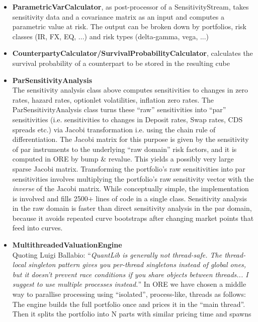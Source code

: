 \documentclass[12pt, a4paper]{report}
\begin{document}
\begin{itemize}
\begin{itemize}
\item writes stress test report to a file
\end{itemize}
\item {\bf ParametricVarCalculator}, as post-processor of a SensitivityStream, takes sensitivity data
  and a covariance matrix as an input and computes a parametric value at risk. The output can be
  broken down by portfolios, risk classes (IR, FX, EQ, ...) and risk types (delta-gamma, vega, ...)
\item {\bf CounterpartyCalculator/SurvivalProbabilityCalculator}, calculates the survival probability
  of a counterpart to be stored in the resulting cube
\item {\bf ParSensitivityAnalysis} \\ 
  The sensitivity analysis class above computes sensitivities to changes in zero rates, hazard rates,
  optionlet volatilities, inflation zero rates. The ParSensitivityAnalysis class turns these ``raw''
  sensitivities into ``par'' sensitivities (i.e. sensitivities to changes in Deposit rates, Swap
  rates, CDS spreads etc.) via Jacobi transformation i.e. using the chain rule of differentiation.
  The Jacobi matrix for this purpose is given by the sensitivity of par instruments to the underlying
  ``raw domain'' risk factors, and it is computed in ORE by bump \& revalue.
  This yields a possibly very large sparse Jacobi matrix. Transforming the portfolio's
  raw sensitivities into par sensitivities involves multiplying the portfolio's raw sensitivity vector
  with the {\em inverse} of the Jacobi matrix. While conceptually simple, the implementation is
  involved and fills 2500+ lines of code in a single class.  Sensitivity analysis in the raw domain is
  faster than direct sensitivity analysis in the par domain, because it avoids repeated curve
  bootstraps after changing market points that feed into curves.
\item {\bf MultithreadedValuationEngine} \\
  Quoting Luigi Ballabio: ``{\em QuantLib is generally not
  thread-safe. The thread-local singleton pattern gives you per-thread singletons instead of global
  ones, but it doesn't prevent race conditions if you share objects between threads... I suggest to
  use multiple processes instead.}'' In ORE we have chosen a middle way to parallise processing using
  ``isolated'', process-like, threads as follows: The engine builds the full portfolio once and
  prices it in the ``main thread''.
  Then it splits the portfolio into N parts with similar pricing time and spawns

\end{itemize}
\end{document}
